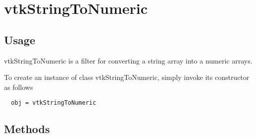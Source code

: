\section{vtkStringToNumeric}

\subsection{Usage}

 vtkStringToNumeric is a filter for converting a string array
 into a numeric arrays.

To create an instance of class vtkStringToNumeric, simply
invoke its constructor as follows
\begin{verbatim}
  obj = vtkStringToNumeric
\end{verbatim}
\subsection{Methods}

